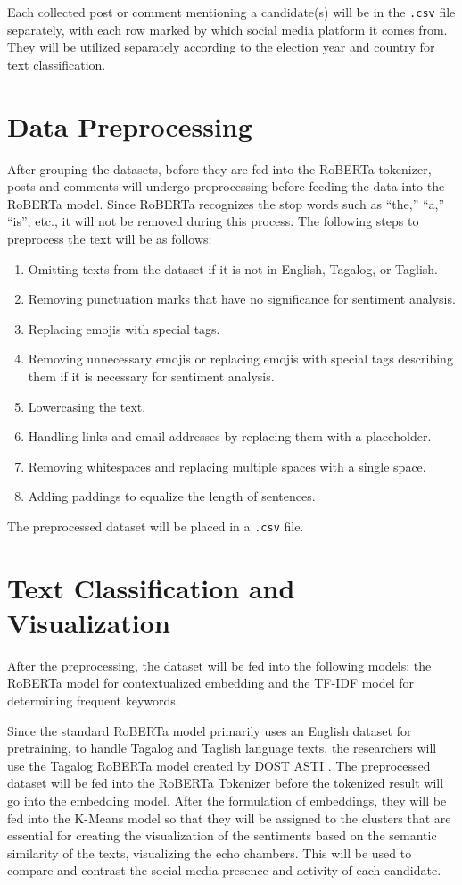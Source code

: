 Each collected post or comment mentioning a candidate(s) will be in the \texttt{.csv} file separately, with each row marked by which social media platform it comes from. They will be utilized separately according to the election year and country for text classification.

\section{Data Preprocessing}
After grouping the datasets, before they are fed into the RoBERTa tokenizer, posts and comments will undergo preprocessing before feeding the data into the RoBERTa model. Since RoBERTa recognizes the stop words such as “the,” “a,” “is”, etc., it will not be removed during this process. The following steps to preprocess the text will be as follows:

\begin{enumerate}
    \item Omitting texts from the dataset if it is not in English, Tagalog, or Taglish.
    \item Removing punctuation marks that have no significance for sentiment analysis.
    \item Replacing emojis with special tags.
    \item Removing unnecessary emojis or replacing emojis with special tags describing them if it is necessary for sentiment analysis.
    \item Lowercasing the text.
    \item Handling links and email addresses by replacing them with a placeholder.
    \item Removing whitespaces and replacing multiple spaces with a single space.
    \item Adding paddings to equalize the length of sentences.
\end{enumerate}

The preprocessed dataset will be placed in a \texttt{.csv} file.

\section{Text Classification and Visualization}
After the preprocessing, the dataset will be fed into the following models: the RoBERTa model for contextualized embedding and the TF-IDF model for determining frequent keywords.

Since the standard RoBERTa model primarily uses an English dataset for pretraining, to handle Tagalog and Taglish language texts, the researchers will use the Tagalog RoBERTa model created by \textsc{DOST ASTI} \cite{MTHD_RoBERTa-model}. The preprocessed dataset will be fed into the RoBERTa Tokenizer before the tokenized result will go into the embedding model. After the formulation of embeddings, they will be fed into the K-Means model so that they will be assigned to the clusters that are essential for creating the visualization of the sentiments based on the semantic similarity of the texts, visualizing the echo chambers. This will be used to compare and contrast the social media presence and activity of each candidate.

